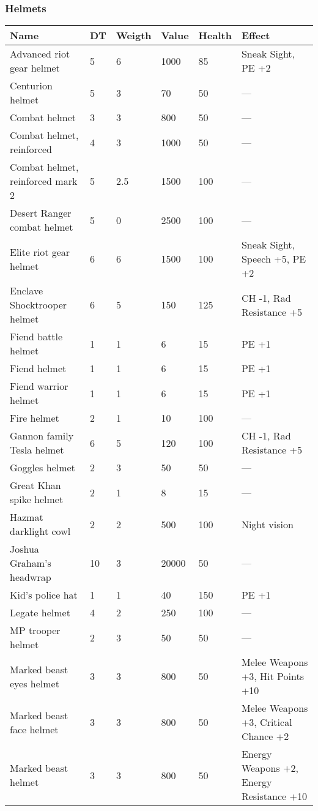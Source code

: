 
\subsubsection{Helmets}
\begin{longtable}{|p{5cm}|p{0.8cm}|p{1.3cm}|p{1.1cm}|p{1.2cm}|p{5.5cm}|}
\hline
\bfseries Name & \bfseries DT & \bfseries Weigth & \bfseries Value & \bfseries Health & \bfseries Effect \\
\hline
\endhead
Advanced riot gear helmet & 5 & 6 & 1000 & 85 & Sneak Sight, PE +2 \\
Centurion helmet & 5 & 3 & 70 & 50 & — \\
Combat helmet & 3 & 3 & 800 & 50 & — \\
Combat helmet, reinforced & 4 & 3 & 1000 & 50 & — \\
Combat helmet, reinforced mark 2 & 5 & 2.5 & 1500 & 100 & — \\
Desert Ranger combat helmet & 5 & 0 & 2500 & 100 & — \\
Elite riot gear helmet & 6 & 6 & 1500 & 100 & Sneak Sight, Speech +5, PE +2 \\
Enclave Shocktrooper helmet & 6 & 5 & 150 & 125 & CH -1, Rad Resistance +5 \\
Fiend battle helmet & 1 & 1 & 6 & 15 & PE +1 \\
Fiend helmet & 1 & 1 & 6 & 15 & PE +1 \\
Fiend warrior helmet & 1 & 1 & 6 & 15 & PE +1 \\
Fire helmet & 2 & 1 & 10 & 100 & — \\
Gannon family Tesla helmet & 6 & 5 & 120 & 100 & CH -1, Rad Resistance +5 \\
Goggles helmet & 2 & 3 & 50 & 50 & — \\
Great Khan spike helmet & 2 & 1 & 8 & 15 & — \\
Hazmat darklight cowl & 2 & 2 & 500 & 100 & Night vision \\
Joshua Graham's headwrap & 10 & 3 & 20000 & 50 & — \\
Kid's police hat & 1 & 1 & 40 & 150 & PE +1 \\
Legate helmet & 4 & 2 & 250 & 100 & — \\
MP trooper helmet & 2 & 3 & 50 & 50 & — \\
Marked beast eyes helmet & 3 & 3 & 800 & 50 & Melee Weapons +3, Hit Points +10 \\
Marked beast face helmet & 3 & 3 & 800 & 50 & Melee Weapons +3, Critical Chance +2 \\
Marked beast helmet & 3 & 3 & 800 & 50 & Energy Weapons +2, Energy Resistance +10 \\

\end{longtable}
